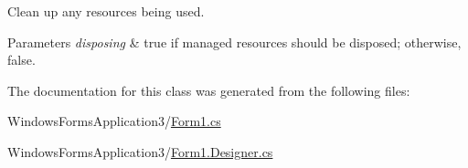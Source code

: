 Clean up any resources being used. 


\begin{DoxyParams}{Parameters}
{\em disposing} & true if managed resources should be disposed; otherwise, false.\\
\hline
\end{DoxyParams}


The documentation for this class was generated from the following files\+:\begin{DoxyCompactItemize}
\item 
Windows\+Forms\+Application3/\hyperlink{_form1_8cs}{Form1.\+cs}\item 
Windows\+Forms\+Application3/\hyperlink{_form1_8_designer_8cs}{Form1.\+Designer.\+cs}\end{DoxyCompactItemize}
